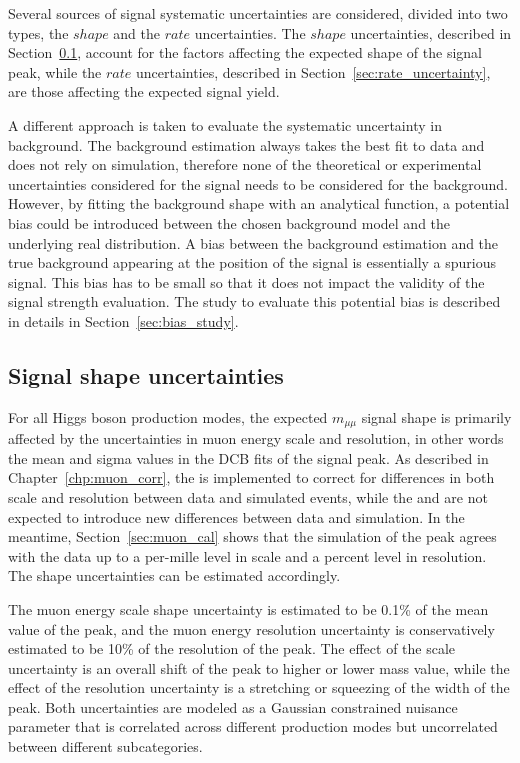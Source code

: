 Several sources of signal systematic uncertainties are considered, divided into two types, the $shape$ and the $rate$ uncertainties.
The $shape$ uncertainties, described in Section~\ref{sec:shape_uncertainty}, account for the factors affecting the expected shape of the signal peak, 
while the $rate$ uncertainties, described in Section~\ref{sec:rate_uncertainty}, are those affecting the expected signal yield.

A different approach is taken to evaluate the systematic uncertainty in background.
The background estimation always takes the best fit to data and does not rely on simulation,
therefore none of the theoretical or experimental uncertainties considered for the signal needs to be considered for the background.
However, by fitting the background shape with an analytical function, 
a potential bias could be introduced between the chosen background model and the underlying real distribution.
A bias between the background estimation and the true background appearing at the position of the signal is essentially a spurious signal.
This bias has to be small so that it does not impact the validity of the signal strength evaluation.
The study to evaluate this potential bias is described in details in Section~\ref{sec:bias_study}. 

\subsection{Signal shape uncertainties}\label{sec:shape_uncertainty}
For all Higgs boson production modes, the expected $m_{\mu\mu}$ signal shape is primarily affected by the uncertainties in muon energy scale and resolution,
in other words the mean and sigma values in the DCB fits of the signal peak. 
As described in Chapter~\ref{chp:muon_corr}, the \RochCorr is implemented to correct for differences in both scale and resolution between data and simulated events, 
while the \FSR and \GeoFit are not expected to introduce new differences between data and simulation.
In the meantime, Section~\ref{sec:muon_cal} shows that the simulation of the \DY peak agrees with the data up to a per-mille level in scale and a percent level in resolution.
The shape uncertainties can be estimated accordingly.

The muon energy scale shape uncertainty is estimated to be 0.1\% of the mean value of the \mmm peak, 
and the muon energy resolution uncertainty is conservatively estimated to be 10\% of the resolution of the \mmm peak. 
The effect of the scale uncertainty is an overall shift of the \mmm peak to higher or lower mass value,
while the effect of the resolution uncertainty is a stretching or squeezing of the width of the \mmm peak.
Both uncertainties are modeled as a Gaussian constrained nuisance parameter 
that is correlated across different production modes but uncorrelated between different subcategories.


